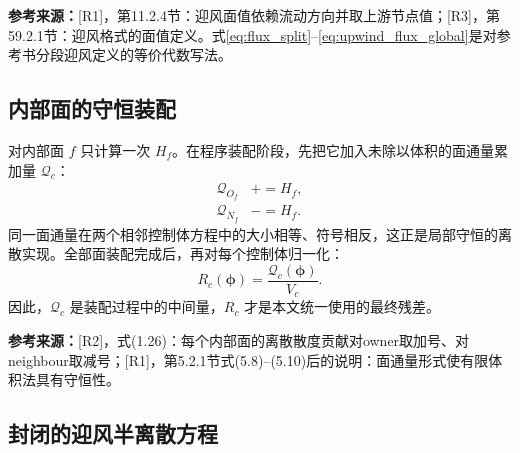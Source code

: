 \documentclass[UTF8,12pt,a4paper]{ctexart}
\numberwithin{equation}{section}
\newcommand{\Rone}{\textnormal{[R1]}}
\newcommand{\Rtwo}{\textnormal{[R2]}}
\newcommand{\Rthree}{\textnormal{[R3]}}
\newcommand{\source}[1]{%
  \par\smallskip
  \noindent\colorbox{sourcebg}{%
    \parbox{0.955\linewidth}{\footnotesize\color{sourcegray}\textbf{参考来源：}#1}%
  }
  \par\smallskip
}
\newcommand{\phiv}{\bm\phi}
\begin{document}
\source{\Rone，第11.2.4节：迎风面值依赖流动方向并取上游节点值；\Rthree，第59.2.1节：迎风格式的面值定义。式\eqref{eq:flux_split}--\eqref{eq:upwind_flux_global}是对参考书分段迎风定义的等价代数写法。}

\subsection{内部面的守恒装配}

对内部面 $f$ 只计算一次 $H_f$。在程序装配阶段，先把它加入未除以体积的面通量累加量 $\mathcal Q_c$：
\begin{align}
  \mathcal Q_{O_f}&\mathrel{+}=H_f,
  \label{eq:owner_add}\\
  \mathcal Q_{N_f}&\mathrel{-}=H_f.
  \label{eq:neighbour_subtract}
\end{align}
同一面通量在两个相邻控制体方程中的大小相等、符号相反，这正是局部守恒的离散实现。全部面装配完成后，再对每个控制体归一化：
\begin{equation}
  R_c(\phiv)=\frac{\mathcal Q_c(\phiv)}{V_c}.
  \label{eq:residual_from_accumulator}
\end{equation}
因此，$\mathcal Q_c$ 是装配过程中的中间量，$R_c$ 才是本文统一使用的最终残差。

\source{\Rtwo，式(1.26)：每个内部面的离散散度贡献对owner取加号、对neighbour取减号；\Rone，第5.2.1节式(5.8)--(5.10)后的说明：面通量形式使有限体积法具有守恒性。}

\subsection{封闭的迎风半离散方程}
\end{document}
